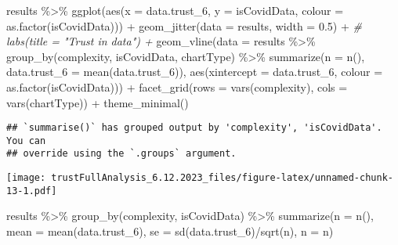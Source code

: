 \documentclass[
]{article}
\newenvironment{Shaded}{\begin{snugshade}}{\end{snugshade}}
\newcommand{\AttributeTok}[1]{\textcolor[rgb]{0.77,0.63,0.00}{#1}}
\newcommand{\CommentTok}[1]{\textcolor[rgb]{0.56,0.35,0.01}{\textit{#1}}}
\newcommand{\FloatTok}[1]{\textcolor[rgb]{0.00,0.00,0.81}{#1}}
\newcommand{\FunctionTok}[1]{\textcolor[rgb]{0.00,0.00,0.00}{#1}}
\newcommand{\NormalTok}[1]{#1}
\newcommand{\SpecialCharTok}[1]{\textcolor[rgb]{0.00,0.00,0.00}{#1}}
\begin{document}
\begin{Shaded}
\begin{Highlighting}[]
\NormalTok{results }\SpecialCharTok{\%\textgreater{}\%}
  \FunctionTok{ggplot}\NormalTok{(}\FunctionTok{aes}\NormalTok{(}\AttributeTok{x =}\NormalTok{ data.trust\_6, }\AttributeTok{y =}\NormalTok{ isCovidData, }\AttributeTok{colour =} \FunctionTok{as.factor}\NormalTok{(isCovidData))) }\SpecialCharTok{+}
  \FunctionTok{geom\_jitter}\NormalTok{(}\AttributeTok{data =}\NormalTok{ results, }\AttributeTok{width =} \FloatTok{0.5}\NormalTok{) }\SpecialCharTok{+}
  \CommentTok{\# labs(title = "Trust in data") + }
  \FunctionTok{geom\_vline}\NormalTok{(}\AttributeTok{data =}\NormalTok{ results }\SpecialCharTok{\%\textgreater{}\%} 
                \FunctionTok{group\_by}\NormalTok{(complexity, isCovidData, chartType) }\SpecialCharTok{\%\textgreater{}\%}
                \FunctionTok{summarize}\NormalTok{(}\AttributeTok{n =} \FunctionTok{n}\NormalTok{(), }
                          \AttributeTok{data.trust\_6 =} \FunctionTok{mean}\NormalTok{(data.trust\_6)), }
              \FunctionTok{aes}\NormalTok{(}\AttributeTok{xintercept =}\NormalTok{ data.trust\_6, }\AttributeTok{colour =} \FunctionTok{as.factor}\NormalTok{(isCovidData))) }\SpecialCharTok{+}
  \FunctionTok{facet\_grid}\NormalTok{(}\AttributeTok{rows =} \FunctionTok{vars}\NormalTok{(complexity), }\AttributeTok{cols =} \FunctionTok{vars}\NormalTok{(chartType)) }\SpecialCharTok{+}
  \FunctionTok{theme\_minimal}\NormalTok{()}
\end{Highlighting}
\end{Shaded}

\begin{verbatim}
## `summarise()` has grouped output by 'complexity', 'isCovidData'. You can
## override using the `.groups` argument.
\end{verbatim}

\texttt{[image: trustFullAnalysis\_6.12.2023\_files/figure-latex/unnamed-chunk-13-1.pdf]}

\begin{Shaded}
\begin{Highlighting}[]
\NormalTok{results }\SpecialCharTok{\%\textgreater{}\%} 
  \FunctionTok{group\_by}\NormalTok{(complexity, isCovidData) }\SpecialCharTok{\%\textgreater{}\%}
  \FunctionTok{summarize}\NormalTok{(}\AttributeTok{n =} \FunctionTok{n}\NormalTok{(), }
            \AttributeTok{mean =} \FunctionTok{mean}\NormalTok{(data.trust\_6),}
            \AttributeTok{se =} \FunctionTok{sd}\NormalTok{(data.trust\_6)}\SpecialCharTok{/}\FunctionTok{sqrt}\NormalTok{(n),}
            \AttributeTok{n =}\NormalTok{ n)}
\end{Highlighting}
\end{Shaded}
\end{document}
